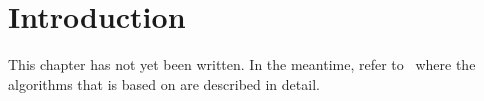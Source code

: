 \chapter{Introduction}
\label{sec:introduction}

This chapter has not yet been written. In the meantime, refer
to~\cite{KirLog06,KirLog07} where the algorithms that \ffc{} is based
on are described in detail.











